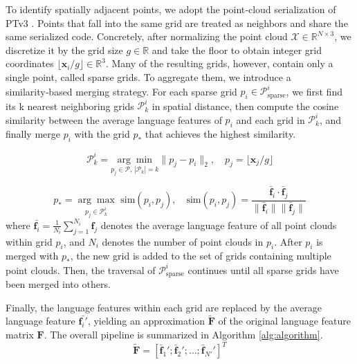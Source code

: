 \documentclass[runningheads]{llncs}
\begin{document}
To identify spatially adjacent points, we adopt the point‑cloud serialization of PTv3 \cite{wu2024ptv3,wu2022ptv2,wu2024ppt,pointcept2023}. Points that fall into the same grid are treated as neighbors and share the same serialized code. Concretely, after normalizing the point cloud $\mathcal{X} \in \mathbb{R}^{N \times 3}$, we discretize it by the grid size $g \in \mathbb{R}$ and take the floor to obtain integer grid coordinates $\lfloor \mathbf{x}_i/g \rfloor \in \mathbb{R}^{3}$.
Many of the resulting grids, however, contain only a single point, called sparse grids. To aggregate them, we introduce a similarity‑based merging strategy. For each sparse grid $p_i \in \mathcal{P}_\text{sparse}^i$, we first find its k nearest neighboring grids $\mathcal{P}_k^i$ in spatial distance, then compute the cosine similarity between the average language features of $p_i$ and each grid in $\mathcal{P}_k^i$, and finally merge $p_i$ with the grid $p_*$ that achieves the highest similarity.

\begin{equation}
    \mathcal{P}_k^i = \underset{p_j \in \mathcal{P},\, |\mathcal{P}_k|=k}{\arg\min} \|p_j - p_i\|_2, \quad p_j = \lfloor \mathbf{x}_j/g \rfloor
\end{equation}

\begin{equation}
    p_* = \underset{p_j \in \mathcal{P}_k^i} {\arg\max} \text{ sim}(p_i, p_j), \quad\text{sim}(p_i, p_j) = \frac{\bar{\mathbf{f}}_i \cdot \bar{\mathbf{f}}_j}{\|\bar{\mathbf{f}}_i\| \|\bar{\mathbf{f}}_j\|}
\end{equation}
where $\bar{\mathbf{f}_i} = \frac{1}{N_i} \sum_{j=1}^{N_i} \mathbf{f}_j$ denotes the average language feature of all point clouds within grid $p_i$, and $N_i$ denotes the number of point clouds in $p_i$. 
After $p_i$ is merged with $p_*$, the new grid is added to the set of grids containing multiple point clouds. Then, the traversal of $\mathcal{P}_\text{sparse}^i$ continues until all sparse grids have been merged into others. 

Finally, the language features within each grid are replaced by the average language feature $\bar{\mathbf{f}_i'}$, yielding an approximation $\tilde{\mathbf{F}}$ of the original language feature matrix $\mathbf{F}$. The overall pipeline is summarized in Algorithm \ref{alg:algorithm}.
\begin{equation}
    \tilde{\mathbf{F}} = [\bar{\mathbf{f}}_1';\bar{\mathbf{f}}_2';\dots;\bar{\mathbf{f}}_{N'}']^T
\end{equation}
\end{document}
